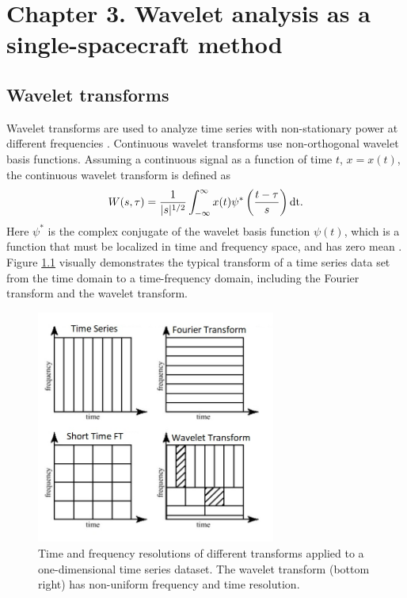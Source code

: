 \chapter{Chapter 3. Wavelet analysis as a single-spacecraft method}


\section{Wavelet transforms}

Wavelet transforms are used to analyze time series with non-stationary power at different frequencies \citep{Torrence:1998}. Continuous wavelet transforms use non-orthogonal wavelet basis functions. Assuming a continuous signal as a function of time $t$, $x=x(t)$, the continuous wavelet transform is defined as
\begin{equation}
    W(s,\tau) = \frac{1}{|s|^{1/2}}\int_{-\infty}^\infty x(t)\psi^*\left( \frac{t-\tau}{s} \right)\textnormal{dt}.
    \label{eq:wavetrans}
\end{equation}
Here $\psi^*$ is the complex conjugate of the wavelet basis function $\psi(t)$, which is a function that must be localized in time and frequency space, and has zero mean \citep{Torrence:1998}. Figure \ref{fig:wavelet-diagram} visually demonstrates the typical transform of a time series data set from the time domain to a time-frequency domain, including the Fourier transform and the wavelet transform.

\begin{figure}
    \centering
    \includegraphics[width=0.7\textwidth]{Figures/Comparisonoftransformations.jpeg}
    \caption[Time and frequency resolutions of different transforms]{Time and frequency resolutions of different transforms applied to a one-dimensional time series dataset. The wavelet transform (bottom right) has non-uniform frequency and time resolution.}
    \label{fig:wavelet-diagram}
\end{figure}

